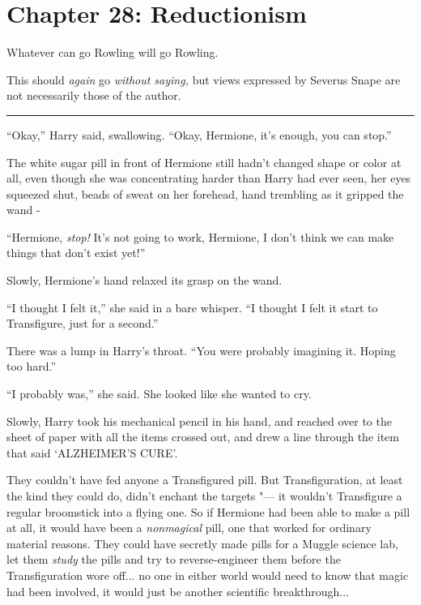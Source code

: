 \chapter{Chapter 28: Reductionism}
Whatever can go Rowling will go Rowling.

This should \emph{again} go \emph{without saying,} but views expressed
by Severus Snape are not necessarily those of the author.

\begin{center}\rule{3in}{0.4pt}\end{center}

``Okay,'' Harry said, swallowing. ``Okay, Hermione, it's enough, you can
stop.''

The white sugar pill in front of Hermione still hadn't changed shape or
color at all, even though she was concentrating harder than Harry had
ever seen, her eyes squeezed shut, beads of sweat on her forehead, hand
trembling as it gripped the wand -

``Hermione, \emph{stop!} It's not going to work, Hermione, I don't think
we can make things that don't exist yet!''

Slowly, Hermione's hand relaxed its grasp on the wand.

``I thought I felt it,'' she said in a bare whisper. ``I thought I felt
it start to Transfigure, just for a second.''

There was a lump in Harry's throat. ``You were probably imagining it.
Hoping too hard.''

``I probably was,'' she said. She looked like she wanted to cry.

Slowly, Harry took his mechanical pencil in his hand, and reached over
to the sheet of paper with all the items crossed out, and drew a line
through the item that said `ALZHEIMER'S CURE'.

They couldn't have fed anyone a Transfigured pill. But Transfiguration,
at least the kind they could do, didn't enchant the targets "--- it
wouldn't Transfigure a regular broomstick into a flying one. So if
Hermione had been able to make a pill at all, it would have been a
\emph{nonmagical} pill, one that worked for ordinary material reasons.
They could have secretly made pills for a Muggle science lab, let them
\emph{study} the pills and try to reverse-engineer them before the
Transfiguration wore off... no one in either world would need to
know that magic had been involved, it would just be another scientific
breakthrough...

